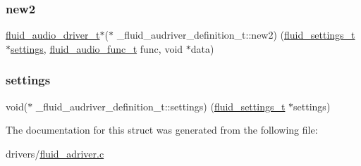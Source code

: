 \subsubsection{\texorpdfstring{new2}{new2}}
{\footnotesize\ttfamily \hyperlink{types_8h_ac3706330ce49cac5b7dd079e90d376d8}{fluid\+\_\+audio\+\_\+driver\+\_\+t}$\ast$($\ast$ \+\_\+fluid\+\_\+audriver\+\_\+definition\+\_\+t\+::new2) (\hyperlink{types_8h_aa363402d3c77333b0f070ba531d034ba}{fluid\+\_\+settings\+\_\+t} $\ast$\hyperlink{struct__fluid__audriver__definition__t_aee73dfdbac8dba21dc75b7ee0babe90f}{settings}, \hyperlink{audio_8h_a3bcb63db55c58403dad66496422ec462}{fluid\+\_\+audio\+\_\+func\+\_\+t} func, void $\ast$data)}

\mbox{\label{struct__fluid__audriver__definition__t_aee73dfdbac8dba21dc75b7ee0babe90f}} 
\subsubsection{\texorpdfstring{settings}{settings}}
{\footnotesize\ttfamily void($\ast$ \+\_\+fluid\+\_\+audriver\+\_\+definition\+\_\+t\+::settings) (\hyperlink{types_8h_aa363402d3c77333b0f070ba531d034ba}{fluid\+\_\+settings\+\_\+t} $\ast$settings)}



The documentation for this struct was generated from the following file\+:\begin{DoxyCompactItemize}
\item 
drivers/\hyperlink{fluid__adriver_8c}{fluid\+\_\+adriver.\+c}\end{DoxyCompactItemize}
